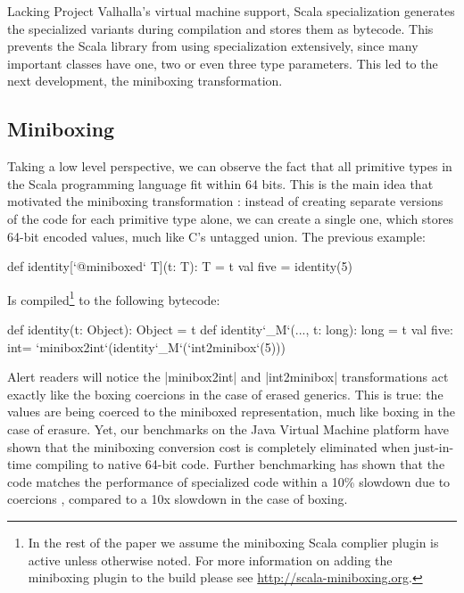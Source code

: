 Lacking Project Valhalla's virtual machine support, Scala specialization generates the specialized variants during compilation and stores them as bytecode. This prevents the Scala library from using specialization extensively, since many important classes have one, two or even three type parameters. This led to the next development, the miniboxing transformation.

\subsection{Miniboxing}

Taking a low level perspective, we can observe the fact that all primitive types in the Scala programming language fit within 64 bits. This is the main idea that motivated the miniboxing transformation \cite{miniboxing}: instead of creating separate versions of the code for each primitive type alone, we can create a single one, which stores 64-bit encoded values, much like C's untagged union. The previous example:

\begin{lstlisting-nobreak}
 def identity[`@miniboxed` T](t: T): T = t
 val five = identity(5)
\end{lstlisting-nobreak}

Is compiled\footnote{In the rest of the paper we assume the miniboxing Scala complier plugin is active unless otherwise noted. For more information on adding the miniboxing plugin to the build please see \url{http://scala-miniboxing.org}.} to the following bytecode:

\begin{lstlisting-nobreak}
 def identity(t: Object): Object = t
 def identity`_M`(..., t: long): long = t
 val five: int= `minibox2int`(identity`_M`(`int2minibox`(5)))
\end{lstlisting-nobreak}

Alert readers will notice the |minibox2int| and |int2minibox| transformations act exactly like the boxing coercions in the case of erased generics. This is true: the values are being coerced to the miniboxed representation, much like boxing in the case of erasure. Yet, our benchmarks on the Java Virtual Machine platform have shown that the miniboxing conversion cost is completely eliminated when just-in-time compiling to native 64-bit code. Further benchmarking has shown that the code matches the performance of specialized code within a 10\% slowdown due to coercions \cite{miniboxing}, compared to a 10x slowdown in the case of boxing.

